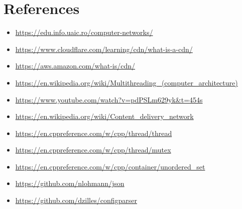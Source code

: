 \documentclass[runningheads]{llncs}
\begin{document}
\section{References}
\begin{itemize}
    \item \url{https://edu.info.uaic.ro/computer-networks/}
    \item \url{https://www.cloudflare.com/learning/cdn/what-is-a-cdn/}
    \item \url{https://aws.amazon.com/what-is/cdn/}
    \item \url{https://en.wikipedia.org/wiki/Multithreading_(computer_architecture)}
    \item \url{https://www.youtube.com/watch?v=pdPSLm629yk&t=454s}
    \item \url{https://en.wikipedia.org/wiki/Content_delivery_network}
    \item \url{https://en.cppreference.com/w/cpp/thread/thread}
    \item \url{https://en.cppreference.com/w/cpp/thread/mutex}
    \item \url{https://en.cppreference.com/w/cpp/container/unordered_set}
    \item \url{https://github.com/nlohmann/json}
    \item \url{https://github.com/dzilles/configparser}
\end{itemize}
\end{document}
